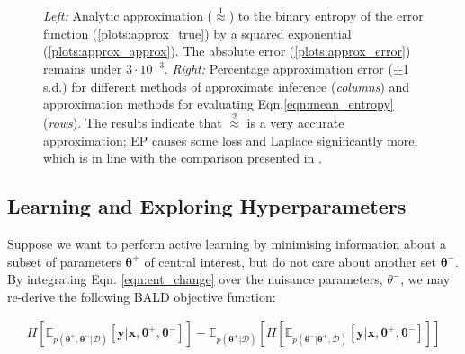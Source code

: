 \documentclass{article}
\newcommand{\x}{\bm{x}}
\newcommand{\y}{\bm{y}}
\newcommand{\data}{\mathcal{D}}
\newcommand{\param}{\bm{\theta}}
\newcommand{\ourmethod}{BALD } %
\newcommand{\E}{\mathbb{E}}
\begin{document}
\begin{figure}\centering
{}
\caption{\emph{Left:} Analytic approximation ({\scriptsize $\stackrel{1}{\approx}$}) to the binary entropy of the error function (\ref{plots:approx_true}) by a squared exponential (\ref{plots:approx_approx}). The absolute error (\ref{plots:approx_error}) remains under $3\cdot 10^{-3}$. \emph{Right:} Percentage approximation error ($\pm$1 s.d.) for different methods of approximate inference (\emph{columns}) and approximation methods for evaluating Eqn.\eqref{eqn:mean_entropy} (\emph{rows}). The results indicate that {\scriptsize $\stackrel{2}{\approx}$} is a very accurate approximation; EP causes some loss and Laplace significantly more, which is in line with the comparison presented in \cite{Kuss05}. }\label{fig:trick}
\end{figure}

\subsection{Learning and Exploring Hyperparameters \label{sec:hyperparameters}}

Suppose we want to perform active learning by minimising information about a subset of parameters $\param^+$ of central interest, but do not care about another set $\param^-$. By integrating Eqn. \eqref{eqn:ent_change} over the nuisance parameters, $\theta^-$, we may re-derive the following \ourmethod objective function:

\begin{align}
H\left[\E_{p(\param^+,\param^-\vert \data)}\left[\y|\x,\param^+,\param^-\right]\right] - \E_{p(\param^+|\data)} \left[ H\left[\E_{p(\param^-|\param^+,\data)}[ \y \vert \x, \param^+,\param^- ]\right] \right]\label{eqn:BALD_bipartite}
\end{align}
\end{document}
